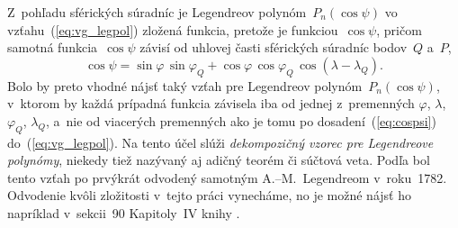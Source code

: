 \documentclass[a4paper,12pt]{book}
\begin{document}
Z~pohľadu sférických súradníc je Legendreov polynóm~$P_n(\cos\psi)$ vo 
vzťahu~(\ref{eq:vg_legpol}) zložená funkcia, pretože je funkciou~$\cos\psi$, 
pričom samotná funkcia~$\cos\psi$ závisí od uhlovej časti sférických súradníc 
bodov~$Q$ a~$P$,
%
\begin{equation}
\label{eq:cospsi}
\cos\psi = \sin\varphi \, \sin\varphi_Q + \cos\varphi \, \cos\varphi_Q \,
\cos(\lambda - \lambda_Q){.}
\end{equation}
%
Bolo by preto vhodné nájsť taký vzťah pre Legendreov polynóm~$P_n(\cos\psi)$,
v~ktorom by každá prípadná funkcia závisela iba od jednej z~premenných
$\varphi$, $ \lambda$, $\varphi_Q$, $\lambda_Q$, a~nie od viacerých
premenných ako je tomu po dosadení~(\ref{eq:cospsi})
do~(\ref{eq:vg_legpol}).  Na tento účel slúži \emph{dekompozičný vzorec pre
Legendreove polynómy}, niekedy tiež nazývaný aj adičný teorém či súčtová veta.
Podľa \textcite{Hobson} bol tento vzťah po prvýkrát odvodený samotným
A.--M.~Legendreom v~roku~1782.  Odvodenie kvôli zložitosti v~tejto práci
vynecháme, no je možné nájsť ho napríklad v~sekcii~90 Kapitoly~IV knihy
\textcite{Hobson}.
\end{document}
